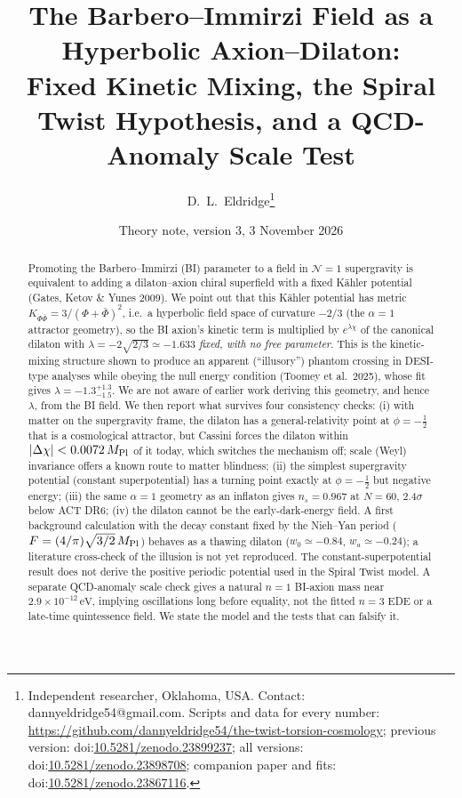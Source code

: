 \documentclass[11pt]{article}
\title{\textbf{The Barbero--Immirzi Field as a Hyperbolic Axion--Dilaton:\\
Fixed Kinetic Mixing, the Spiral Twist Hypothesis, and a QCD-Anomaly Scale Test}}
\author{D.~L.~Eldridge\thanks{Independent researcher, Oklahoma, USA. Contact: dannyeldridge54@gmail.com.
Scripts and data for every number: \url{https://github.com/dannyeldridge54/the-twist-torsion-cosmology};
previous version: doi:\href{https://doi.org/10.5281/zenodo.23899237}{10.5281/zenodo.23899237};
all versions: doi:\href{https://doi.org/10.5281/zenodo.23898708}{10.5281/zenodo.23898708};
companion paper and fits: doi:\href{https://doi.org/10.5281/zenodo.23867116}{10.5281/zenodo.23867116}.}}
\date{Theory note, version 3, 3 November 2026}
\newcommand{\Mp}{M_{\rm Pl}}
\begin{document}
\maketitle

\begin{abstract}
Promoting the Barbero--Immirzi (BI) parameter to a field in $\mathcal N=1$ supergravity is equivalent to adding a
dilaton--axion chiral superfield with a fixed K\"ahler potential (Gates, Ketov \& Yunes 2009). We point out that
this K\"ahler potential has metric $K_{\Phi\bar\Phi}=3/(\Phi+\bar\Phi)^2$, i.e.\ a hyperbolic field space of
curvature $-2/3$ (the $\alpha=1$ attractor geometry), so the BI axion's kinetic term is multiplied by
$e^{\lambda\chi}$ of the canonical dilaton with $\lambda=-2\sqrt{2/3}\simeq-1.633$ \emph{fixed, with no free
parameter}. This is the kinetic-mixing structure shown to produce an apparent (``illusory'') phantom crossing in
DESI-type analyses while obeying the null energy condition (Toomey et al.\ 2025), whose fit gives
$\lambda=-1.3^{+1.3}_{-1.5}$. We are not aware of earlier work deriving this geometry, and hence $\lambda$, from the
BI field. We then report what survives four consistency checks: (i) with matter on the supergravity frame, the
dilaton has a general-relativity point at $\phi=-\tfrac12$ that is a cosmological attractor, but Cassini forces the
dilaton within $|\Delta\chi|<0.0072\,\Mp$ of it today, which switches the mechanism off; scale (Weyl) invariance
offers a known route to matter blindness; (ii) the simplest supergravity potential (constant superpotential) has
a turning point exactly at $\phi=-\tfrac12$ but negative energy; (iii) the same $\alpha=1$ geometry as an inflaton
gives $n_s=0.967$ at $N=60$, $2.4\sigma$ below ACT DR6; (iv) the dilaton cannot be the early-dark-energy field.
A first background calculation with the decay constant fixed by the Nieh--Yan period ($F=(4/\pi)\sqrt{3/2}\,\Mp$)
behaves as a thawing dilaton ($w_0\simeq-0.84$, $w_a\simeq-0.24$); a literature cross-check of the illusion is not
yet reproduced. The constant-superpotential result does not derive the positive periodic potential used in the
Spiral Twist model. A separate QCD-anomaly scale check gives a natural $n=1$ BI-axion mass near
$2.9\times10^{-12}\,\mathrm{eV}$, implying oscillations long before equality, not the fitted $n=3$ EDE or a
late-time quintessence field. We state the model and the tests that can falsify it.
\end{abstract}
\end{document}
